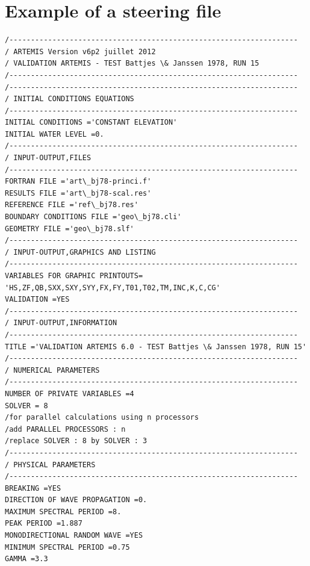 \section{Example of a steering file}
\begin{lstlisting}[language=TelemacCas]
/-------------------------------------------------------------------
/ ARTEMIS Version v6p2 juillet 2012
/ VALIDATION ARTEMIS - TEST Battjes \& Janssen 1978, RUN 15
/-------------------------------------------------------------------
/-------------------------------------------------------------------
/ INITIAL CONDITIONS EQUATIONS
/-------------------------------------------------------------------
INITIAL CONDITIONS ='CONSTANT ELEVATION'
INITIAL WATER LEVEL =0.
/-------------------------------------------------------------------
/ INPUT-OUTPUT,FILES
/-------------------------------------------------------------------
FORTRAN FILE ='art\_bj78-princi.f'
RESULTS FILE ='art\_bj78-scal.res'
REFERENCE FILE ='ref\_bj78.res'
BOUNDARY CONDITIONS FILE ='geo\_bj78.cli'
GEOMETRY FILE ='geo\_bj78.slf'
/-------------------------------------------------------------------
/ INPUT-OUTPUT,GRAPHICS AND LISTING
/-------------------------------------------------------------------
VARIABLES FOR GRAPHIC PRINTOUTS=
'HS,ZF,QB,SXX,SXY,SYY,FX,FY,T01,T02,TM,INC,K,C,CG'
VALIDATION =YES
/-------------------------------------------------------------------
/ INPUT-OUTPUT,INFORMATION
/-------------------------------------------------------------------
TITLE ='VALIDATION ARTEMIS 6.0 - TEST Battjes \& Janssen 1978, RUN 15'
/-------------------------------------------------------------------
/ NUMERICAL PARAMETERS
/-------------------------------------------------------------------
NUMBER OF PRIVATE VARIABLES =4
SOLVER = 8
/for parallel calculations using n processors
/add PARALLEL PROCESSORS : n
/replace SOLVER : 8 by SOLVER : 3
/-------------------------------------------------------------------
/ PHYSICAL PARAMETERS
/-------------------------------------------------------------------
BREAKING =YES
DIRECTION OF WAVE PROPAGATION =0.
MAXIMUM SPECTRAL PERIOD =8.
PEAK PERIOD =1.887
MONODIRECTIONAL RANDOM WAVE =YES
MINIMUM SPECTRAL PERIOD =0.75
GAMMA =3.3
\end{lstlisting}

